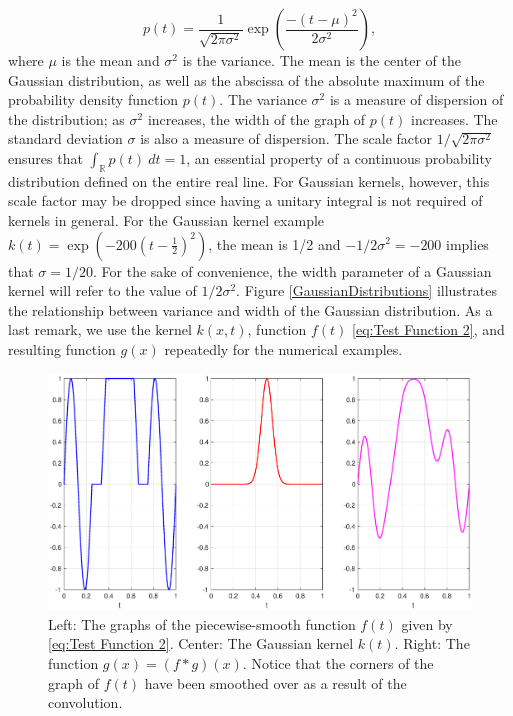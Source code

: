 \documentclass[12pt,notitlepage]{report}
\newcommand{\noiseSD}{\sigma}	%
\begin{document}
\begin{equation}
p(t) = \frac{1}{\sqrt{2\pi\noiseSD^2}}\exp\left(\frac{-(t-\mu)^2}{2\noiseSD^2}\right),
\label{eq:Gaussian kernel}
\end{equation}
where $\mu$ is the mean and $\noiseSD^2$ is the variance. The mean is the center of the Gaussian distribution, as well as the abscissa of the absolute maximum of the probability density function $p(t)$. The variance $\noiseSD^2$ is a measure of dispersion of the distribution; as $\noiseSD^2$ increases, the width of the graph of $p(t)$ increases. The standard deviation $\noiseSD$ is also a measure of dispersion. The scale factor $1/\sqrt{2\pi\noiseSD^2}$ ensures that $\int_{\mathbb{R}} p(t) \: dt = 1$, an essential property of a continuous probability distribution defined on the entire real line. For Gaussian kernels, however, this scale factor may be dropped since having a unitary integral is not required of kernels in general.  For the Gaussian kernel example $k(t) = \exp(-200(t-\frac{1}{2})^2)$, the mean is 1/2 and $-1/2\noiseSD^2 = -200$ implies that $\noiseSD = 1/20$. For the sake of convenience, the width parameter of a Gaussian kernel will refer to the value of $1/2\noiseSD^2$. Figure \ref{GaussianDistributions} illustrates the relationship between variance and width of the Gaussian distribution. As a last remark, we use the kernel $k(x,t)$, function $f(t)$ \eqref{eq:Test Function 2}, and resulting function $g(x)$ repeatedly for the numerical examples.

\begin{figure}
	\centerline{\includegraphics[scale=0.4]{Figures/FunctionKernelPlot.eps}}
\caption{Left: The graphs of the piecewise-smooth function $f(t)$ given by \eqref{eq:Test Function 2}. Center: The Gaussian kernel $k(t)$. Right: The function $g(x) = (f * g)(x)$. Notice that the corners of the graph of $f(t)$ have been smoothed over as a result of the convolution.}
\label{FunctionKernelPlot}
\end{figure}
\end{document}
